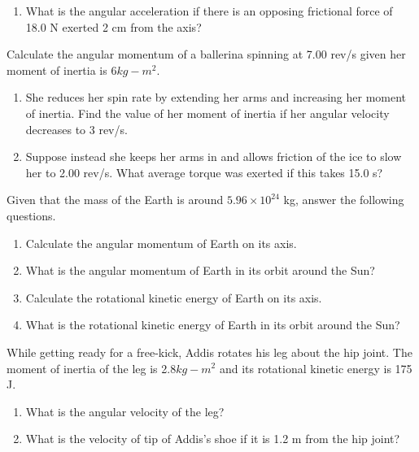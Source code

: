 \documentclass[12pt,addpoints]{exam}
\begin{document}
\begin{questions}
\begin{enumerate}[label=(\roman*)]
			\item What is the angular acceleration if there is an opposing frictional force of 18.0 N exerted 2 cm from the axis?\vspace{1.5in}
		\end{enumerate}
		\question Calculate the angular momentum of a ballerina spinning at 7.00 rev/s given her moment of inertia is 6$kg-m^2$.\vspace{1.5in}
		\begin{enumerate}[label=(\roman*)]
			\item She reduces her spin rate by extending her arms and increasing her moment of inertia. Find the value of her moment of inertia if her angular velocity decreases to 3 rev/s.\vspace{1.5in}
			\item Suppose instead she keeps her arms in and allows friction of the ice to slow her to 2.00 rev/s. What average torque
			was exerted if this takes 15.0 s?\vspace{1.5in}
		\end{enumerate}
		\question Given that the mass of the Earth is around $5.96\times10^{24}$ kg, answer the following questions.
		\begin{enumerate}[label=(\roman*)]
			\item Calculate the angular momentum of Earth on its axis.\vspace{1.5in}
			\item What is the angular momentum of Earth in its orbit around the Sun?\vspace{1.5in}
			\item Calculate the rotational kinetic energy of Earth on its axis.\vspace{1.5in}
			\item What is the rotational kinetic energy of Earth in its orbit around the Sun?\vspace{1.5in}
		\end{enumerate}
		\question While getting ready for a free-kick, Addis rotates his leg about the hip joint. The moment of inertia of the leg is 2.8$kg-m^2$ and its rotational kinetic energy is 175 J.
		\begin{enumerate}[label=(\roman*)]
			\item What is the angular velocity of the leg?\vspace{1.5in}
			\item What is the velocity of tip of Addis’s shoe if it is 1.2 m from the hip joint?\vspace{2.5in}

\end{enumerate}
\end{questions}
\end{document}
